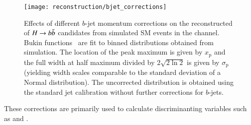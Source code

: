 \begin{figure}[htbp]
  \centering

  \texttt{[image: reconstruction/bjet\_corrections]}

  \caption{Effects of different $b$-jet momentum corrections on the
    reconstructed \mBB of $H \to b\bar{b}$ candidates from simulated SM
    \HH events in the \hadhad channel. Bukin
    functions~\cite{Bukin:2007zha} are fit to binned distributions
    obtained from simulation. The location of the peak maximum is
    given by $x_{\text{p}}$ and the full width at half maximum divided
    by $2\sqrt{2 \ln 2}$ is given by $\sigma_{\text{p}}$ (yielding
    width scales comparable to the standard deviation of a Normal
    distribution). The uncorrected distribution is obtained using the
    standard jet calibration without further corrections for
    $b$-jets.}%
  \label{fig:bjet_momentum_corr_mbb}
\end{figure}

These corrections are primarily used to calculate discriminanting
variables such as \mBB and \dRtautau.


